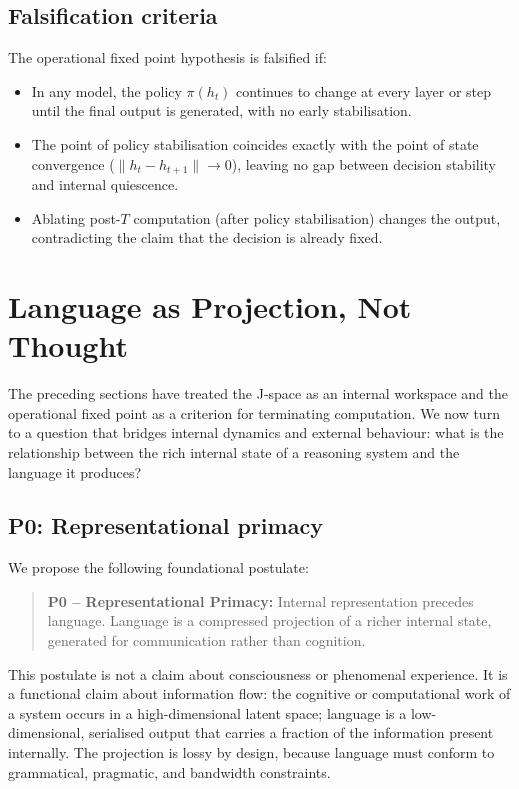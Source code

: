 \documentclass[11pt,a4paper]{article}
\theoremstyle{definition}
\begin{document}
\subsection{Falsification criteria}

The operational fixed point hypothesis is falsified if:
\begin{itemize}
    \item In any model, the policy $\pi(h_t)$ continues to change at every layer
    or step until the final output is generated, with no early stabilisation.
    \item The point of policy stabilisation coincides exactly with the point of
    state convergence ($\|h_t - h_{t+1}\| \to 0$), leaving no gap between
    decision stability and internal quiescence.
    \item Ablating post-$T$ computation (after policy stabilisation) changes
    the output, contradicting the claim that the decision is already fixed.
\end{itemize}

\section{Language as Projection, Not Thought}
\label{sec:language}

The preceding sections have treated the J-space as an internal workspace and the
operational fixed point as a criterion for terminating computation. We now turn
to a question that bridges internal dynamics and external behaviour: what is the
relationship between the rich internal state of a reasoning system and the
language it produces?

\subsection{P0: Representational primacy}

We propose the following foundational postulate:

\begin{quote}
\textbf{P0 -- Representational Primacy:} Internal representation precedes
language. Language is a compressed projection of a richer internal state,
generated for communication rather than cognition.
\end{quote}

This postulate is not a claim about consciousness or phenomenal experience. It
is a functional claim about information flow: the cognitive or computational
work of a system occurs in a high-dimensional latent space; language is a
low-dimensional, serialised output that carries a fraction of the information
present internally. The projection is lossy by design, because language must
conform to grammatical, pragmatic, and bandwidth constraints.
\end{document}
